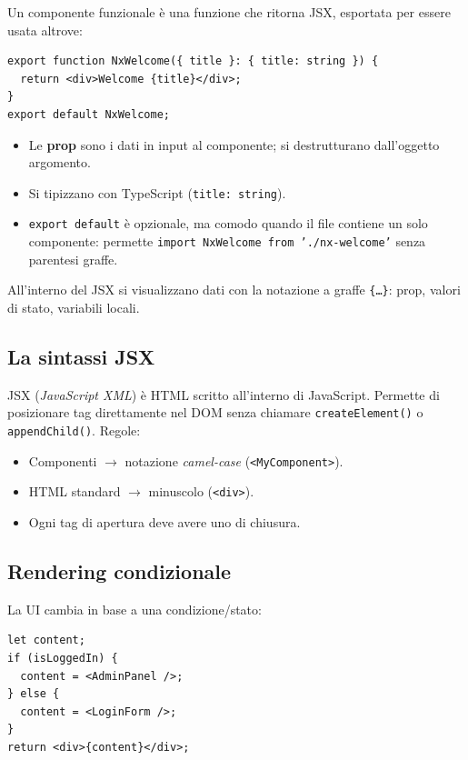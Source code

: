 \documentclass[11pt,a4paper]{article}
\begin{document}
Un componente funzionale \`e una funzione che ritorna JSX, esportata per essere usata altrove:

\begin{lstlisting}[language=tsx]
export function NxWelcome({ title }: { title: string }) {
  return <div>Welcome {title}</div>;
}
export default NxWelcome;
\end{lstlisting}

\begin{itemize}[leftmargin=*]
    \item Le \textbf{prop} sono i dati in input al componente; si destrutturano dall'oggetto argomento.
    \item Si tipizzano con TypeScript (\texttt{title: string}).
    \item \texttt{export default} \`e opzionale, ma comodo quando il file contiene un solo componente: permette \texttt{import NxWelcome from './nx-welcome'} senza parentesi graffe.
\end{itemize}

All'interno del JSX si visualizzano dati con la notazione a graffe \texttt{\{\ldots\}}: prop, valori di stato, variabili locali.

\subsection{La sintassi JSX}

JSX (\emph{JavaScript XML}) \`e HTML scritto all'interno di JavaScript. Permette di posizionare tag direttamente nel DOM senza chiamare \texttt{createElement()} o \texttt{appendChild()}. Regole:
\begin{itemize}[leftmargin=*]
    \item Componenti $\to$ notazione \emph{camel-case} (\texttt{<MyComponent>}).
    \item HTML standard $\to$ minuscolo (\texttt{<div>}).
    \item Ogni tag di apertura deve avere uno di chiusura.
\end{itemize}

\subsection{Rendering condizionale}

La UI cambia in base a una condizione/stato:

\begin{lstlisting}[language=tsx]
let content;
if (isLoggedIn) {
  content = <AdminPanel />;
} else {
  content = <LoginForm />;
}
return <div>{content}</div>;
\end{lstlisting}
\end{document}
